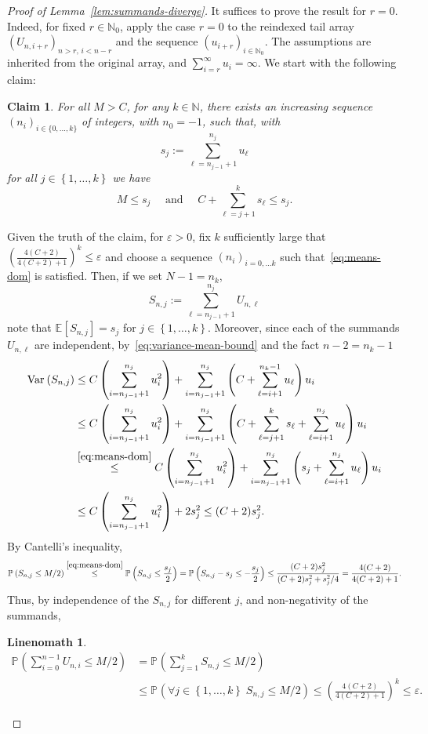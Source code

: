 \documentclass[10pt,a4paper]{amsart}
\newtheorem{clm}{Claim}
\newtheorem{linenomath}{Linenomath}
\newcommand{\E}[2][]{\ensuremath{\mathbb{E}_{#1}\left[#2 \right]}}
\newcommand{\Prob}[2][]{\ensuremath{\mathbb{P}_{#1} \left(#2 \right)}}
\newcommand{\Var}[2][]{\operatorname{Var}_{#1}\left(#2\right)}
\newcommand{\eps}{\varepsilon}
\begin{document}
\begin{proof}[Proof of Lemma~\ref{lem:summands-diverge}]
It suffices to prove the result for $r=0$. Indeed, for fixed $r\in\mathbb{N}_0$, apply the case $r=0$ to the reindexed tail array $(U_{n,i+r})_{n>r,\,i<n-r}$ and the sequence $(u_{i+r})_{i\in \mathbb{N}_0}$. The assumptions are inherited from the original array, and $\sum_{i=r}^{\infty}u_i=\infty$.
We start with the following claim:
\begin{clm} \label{clm:div-sum-ineq}
    For all $M>C$, for any $k \in \mathbb{N}$, there exists an increasing sequence $(n_{i})_{i \in \{0, \ldots, k\}}$ of integers, with $n_{0} = -1$, such that, with
    \[
    s_{j} := 
    \sum_{\ell = n_{j-1}+1}^{n_{j}} u_{\ell}
    \]
    for all $j \in \left\{1, \ldots, k \right\}$ we have 
    \begin{equation} \label{eq:means-dom}
     M \leq s_{j} \quad \text{ and } \quad C + \sum_{\ell = j+1}^{k} s_{\ell} \leq s_{j}.
    \end{equation} 
\end{clm}
Given the truth of the claim, for $\eps > 0$, fix $k$ sufficiently large that $\left(\frac{4(C+2)}{4(C+2)+1}\right)^k \leq \eps$ and choose a sequence $(n_{i})_{i = 0, \ldots k}$ such that~\eqref{eq:means-dom} is satisfied. Then, if we set $N -1 = n_{k}$,
\[
S_{n, j} :=
\sum_{\ell=n_{j-1}+1}^{n_{j}} U_{n, \ell} 
\]
note that $\E{S_{n,j}} = s_{j}$ for $j \in \left\{ 1, \ldots, k\right\}$. Moreover, since each of the summands $U_{n, \ell}$ are independent, by~\eqref{eq:variance-mean-bound} and the fact $n -2 = n_{k}-1$
\begin{align*}
\Var{S_{n,j}} & \leq C\left(\sum_{i=n_{j-1}+1}^{n_{j}} u_{i}^2\right) + \sum_{i=n_{j-1}+1}^{n_{j}} \left(C + \sum_{\ell=i+1}^{n_{k}-1} u_{\ell}\right)u_{i}
\\ & \leq  C\left(\sum_{i=n_{j-1}+1}^{n_{j}} u_{i}^2\right) + \sum_{i=n_{j-1}+1}^{n_{j}} \left(C + \sum_{\ell = j+1}^{k} s_{\ell} + \sum_{\ell=i+1}^{n_{j}} u_{\ell}\right)u_{i}
\\ & \stackrel{\eqref{eq:means-dom}}{\leq} C\left(\sum_{i=n_{j-1}+1}^{n_{j}} u_{i}^2\right) + \sum_{i=n_{j-1}+1}^{n_{j}} \left(s_{j} + \sum_{\ell=i+1}^{n_{j}} u_{\ell}\right)u_{i} 
\\ & \leq C\left(\sum_{i=n_{j-1}+1}^{n_{j}} u_{i}^2\right) + 2s_{j}^2 
\leq (C+2) s_{j}^2. 
 \end{align*}
By  Cantelli's inequality, 
\[
\Prob{S_{n,j} \leq M/2} \stackrel{\eqref{eq:means-dom}}{\leq} \Prob{S_{n,j} \leq \frac{s_{j}}{2}} = \Prob{S_{n,j} - s_{j} \leq - \frac{s_{j}}{2}} \leq \frac{(C+2)s_{j}^2}{(C+2)s_{j}^2 + s_{j}^2/4} = \frac{4(C+2)}{4(C+2) + 1}. 
\]
Thus, by independence of the $S_{n,j}$ for different $j$, and non-negativity of the summands,
\begin{linenomath}
\begin{align*}
\Prob{\sum_{i=0}^{n-1} U_{n,i} \leq M/2} & = \Prob{\sum_{j=1}^{k} S_{n,j} \leq M/2} \\ & \leq \Prob{\forall j\in\left\{1, \ldots, k\right\} \; S_{n,j} \leq M/2} \leq \left(\frac{4(C+2)}{4(C+2)+1}\right)^{k} \leq \eps. 
\end{align*}
\end{linenomath}
\end{proof}
\end{document}
